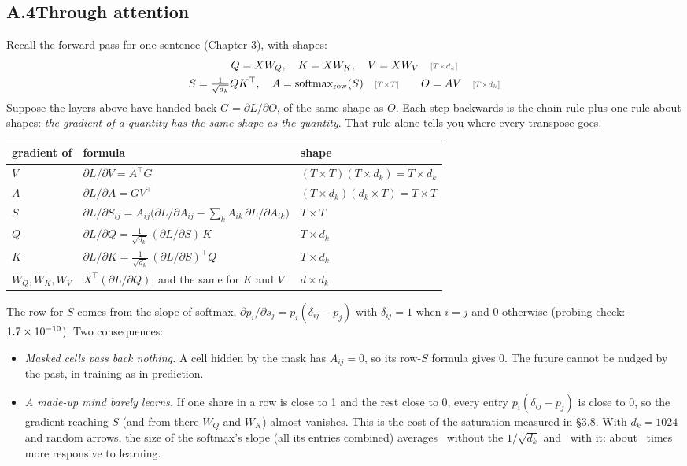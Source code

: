 \subsection*{A.4\quad Through attention}

Recall the forward pass for one sentence (Chapter 3), with shapes:
\begin{gather*}
Q=XW_Q,\quad K=XW_K,\quad V=XW_V \shape{T\times d_k}\\
S=\tfrac{1}{\sqrt{d_k}}QK^\top,\quad A=\softmax_{\text{row}}(S) \shape{T\times T}\qquad O=AV \shape{T\times d_k}
\end{gather*}
Suppose the layers above have handed back $G=\partial L/\partial O$, of the same shape as $O$. Each step
backwards is the chain rule plus one rule about shapes: \emph{the gradient of a quantity has the same shape
as the quantity}. That rule alone tells you where every transpose goes.

\begin{center}
\small
\begin{tabular}{@{}l P{7.6cm} P{4.2cm}@{}}
\toprule
gradient of & formula & shape\\
\midrule
$V$ & $\partial L/\partial V = A^\top G$ & $(T\times T)(T\times d_k) = T\times d_k$\\
$A$ & $\partial L/\partial A = G V^\top$ & $(T\times d_k)(d_k\times T) = T\times T$\\
$S$ & $\partial L/\partial S_{ij} = A_{ij}\big(\partial L/\partial A_{ij} - \textstyle\sum_k A_{ik}\,\partial L/\partial A_{ik}\big)$ & $T\times T$\\
$Q$ & $\partial L/\partial Q = \tfrac{1}{\sqrt{d_k}}\,(\partial L/\partial S)\,K$ & $T\times d_k$\\
$K$ & $\partial L/\partial K = \tfrac{1}{\sqrt{d_k}}\,(\partial L/\partial S)^\top Q$ & $T\times d_k$\\
$W_Q,W_K,W_V$ & $X^\top(\partial L/\partial Q)$, and the same for $K$ and $V$ & $d\times d_k$\\
\bottomrule
\end{tabular}
\end{center}

The row for $S$ comes from the slope of softmax, $\partial p_i/\partial s_j = p_i(\delta_{ij}-p_j)$ with
$\delta_{ij}=1$ when $i=j$ and 0 otherwise (probing check: $1.7\times10^{-10}$). Two consequences:
\begin{itemize}
\item \emph{Masked cells pass back nothing.} A cell hidden by the mask has $A_{ij}=0$, so its row-$S$ formula
gives 0. The future cannot be nudged by the past, in training as in prediction.
\item \emph{A made-up mind barely learns.} If one share in a row is close to 1 and the rest close to 0, every
entry $p_i(\delta_{ij}-p_j)$ is close to 0, so the gradient reaching $S$ (and from there $W_Q$ and $W_K$)
almost vanishes. This is the cost of the saturation measured in \S3.8. With $d_k=1024$ and random arrows, the
size of the softmax's slope (all its entries combined) averages \nAppAJacRaw\ without the $1/\sqrt{d_k}$
and \nAppAJacScaled\ with it: about \nAppAJacRatio\ times more responsive to learning.
\end{itemize}

